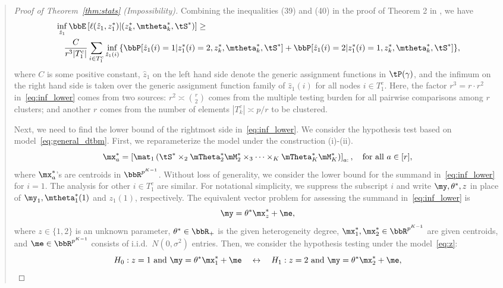 \documentclass[11pt]{article}
\theoremstyle{definition}
\theoremstyle{definition}
\newcommand{\of}[1]{\left(#1\right)}
\newcommand{\off}[1]{\left[#1\right]}
\begin{document}
\begin{enumerate}
\begin{enumerate}[wide]
\begin{quote}
\begin{proof}[Proof of Theorem~\ref{thm:stats} (Impossibility)]
   Combining the inequalities (39) and (40) in the proof of Theorem 2 in \cite{gao2018community}, we have 
   \begin{align}
        & \inf_{\hat z_1 } \bbE \left[ \ell(\hat z_1, z_1^*) | (z^*_k, \mtheta^*_k, \tS^*)  \right] \geq  \\
        & \quad  \frac{C}{r^3 |T_1^c|} \sum_{i \in T_1^c} \inf_{\hat z_1  (i)} \{ \bbP[\hat z_1(i) = 1| z_1^*(i) = 2, z_k^*, \mtheta_k^*, \tS^*] +   \bbP[\hat z_1(i) = 2| z_1^*(i) = 1, z_k^*, \mtheta_k^*, \tS^*] \},
   \end{align}
   where $C$ is some positive constant,  $\hat z_1$ on the left hand side denote the generic assignment functions in $\tP(\gamma)$, and the infimum on the right hand side is taken over the generic assignment function family of $\hat z_1(i)$ for all nodes $i \in T_1^c$. Here, the factor $r^3=r\cdot r^2$ in~\eqref{eq:inf_lower} comes from two sources: $r^2\asymp {r\choose 2}$ comes from the multiple testing burden for all pairwise comparisons among $r$ clusters; and another $r$ comes from the number of elements $|T^c_k|\asymp p/r$ to be clustered. 
   
   Next, we need to find the lower bound of the rightmost side in~\eqref{eq:inf_lower}. 
We consider the hypothesis test based on model~\eqref{eq:general_dtbm}. First, we reparameterize the model under the construction (i)-(ii).
\begin{equation}
    \mx_a^* = \off{\mat_1 \of{ \tS^*\times_2 \mTheta_2^* \mM_2^*\times_3\cdots \times_K \mTheta^*_K \mM_K^* }}_{a:}, \quad \text{for all} \ a \in [r],
\end{equation}
where $\mx_a^*$'s are centroids in $\bbR^{p^{K-1}}$. Without loss of generality, we consider the lower bound for the summand in~\eqref{eq:inf_lower} for $i=1$. The analysis for other $i\in T^c_1$ are similar. For notational simplicity, we suppress the subscript $i$ and write $\my, \theta^*, z$ in place of $\my_1, \mtheta_1^*(1)$ and $z_1(1)$, respectively. The equivalent vector problem for assessing the summand in~\eqref{eq:inf_lower} is
\begin{equation}
\my=\theta^* \mx_{z}^*+\me,
\end{equation}
where $z\in \{1,2\}$ is an unknown parameter, $\theta^* \in \bbR_+$ is the given heterogeneity degree, $\mx_1^*,\mx_2^*\in\bbR^{p^{K-1}}$ are given centroids, and $\me\in\bbR^{p^{K-1}}$ consists of i.i.d.\ $N(0,\sigma^2)$ entries.  Then, we consider the hypothesis testing under the model~\eqref{eq:z}:
\begin{equation}
 H_0: z = 1 \text{ and } \my = \theta^* \mx_1^* + \me \quad \leftrightarrow \quad H_1: z = 2 \text{ and } \my = \theta^* \mx_2^* + \me,
\end{equation}
   

\end{proof}
\end{quote}
\end{enumerate}
\end{enumerate}
\end{document}
